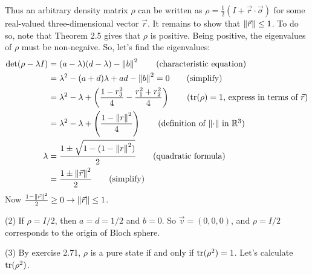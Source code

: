 Thus an arbitrary density matrix $\rho$ can be written as $\rho = \frac{1}{2} (I + \vec{r} \cdot \vec{\sigma})$ for some real-valued three-dimensional vector $\vec{r}$.  It remains to show that $\left\lVert\vec{r}\right\rVert \leq 1$. To do so, note that Theorem 2.5 gives that $\rho$ is positive. Being positive, the eigenvalues of $\rho$ must be non-negaive.  So, let's find the eigenvalues:
\begin{align*}
    \det (\rho - \lambda I) &= (a-  \lambda) (d - \lambda) - \norm{b}^2 \tag{characteristic equation} \\
    &= \lambda^2 - (a+d)\lambda + ad - \norm{b}^2 = 0 \tag{simplify}\\
    &= \lambda^2 -\lambda + \left(\frac{1-r_3^2}{4}-\frac{r_1^2+r_2^2}{4}\right) \tag{$\Tr(\rho)=1$, express in terms of $\vec{r}$}\\
    &= \lambda^2 - \lambda +\left(\frac{1-\norm{r}^2}{4}\right) \tag{definition of $\norm{\cdot}$ in $\mathbb{R}^3$}\\
        \lambda  &= \frac{1 \pm \sqrt{1 - (1 -\norm{r}^2)}}{2}\tag{quadratic formula}\\
        &= \frac{1 \pm \norm{\vec{r}}^2}{2} \tag{simplify}
\end{align*}
Now $\frac{1 - \left\lVert\vec{r}\right\rVert^2}{2} \geq 0 \rightarrow \left\lVert\vec{r}\right\rVert \leq 1$.\newline

\noindent(2) If $\rho = I / 2$, then $a=d=1/2$ and $b=0$.  So $\vec{v} = (0,0,0)$, and $\rho = I / 2$ corresponds to the origin of Bloch sphere.

\noindent(3)  By exercise 2.71, $\rho$ is a pure state if and only if $\operatorname{tr}(\rho^2)=1$. Let's calculate $\operatorname{tr}(\rho^2)$.

